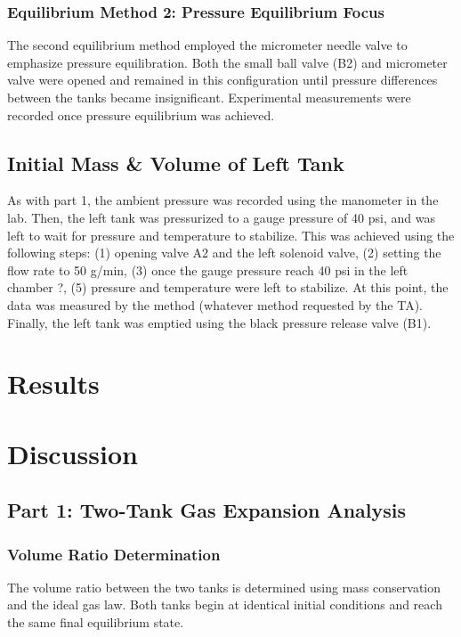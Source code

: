 \documentclass{article} %
\begin{document}
\begin{multicols}{2}
\subsubsection{Equilibrium Method 2: Pressure Equilibrium Focus}

The second equilibrium method employed the micrometer needle valve to emphasize pressure equilibration. Both the small ball valve (B2) and micrometer valve were opened and remained in this configuration until pressure differences between the tanks became insignificant. Experimental measurements were recorded once pressure equilibrium was achieved.
\subsection{Initial Mass \& Volume of Left Tank}
\label{methods_initial_mass_volume_left_tank}

As with part 1, the ambient pressure was recorded using the manometer in the lab.
Then, the left tank was pressurized to a gauge pressure of 40 psi, and was left to wait for pressure and temperature to stabilize.
This was achieved using the following steps:
(1) opening valve A2 and the left solenoid valve, (2) setting the flow rate to 50 g/min, (3) once the gauge pressure reach 40 psi in the left chamber ?, (5) pressure and temperature were left to stabilize.
At this point, the data was measured by the method (whatever method requested by the TA).
Finally, the left tank was emptied using the black pressure release valve (B1).

\section{Results}
\label{results}

\section{Discussion}
\label{discussion}
\subsection{Part 1: Two-Tank Gas Expansion Analysis}

\subsubsection{Volume Ratio Determination}

The volume ratio between the two tanks is determined using mass conservation and the ideal gas law. Both tanks begin at identical initial conditions and reach the same final equilibrium state.


\end{multicols}
\end{document}
